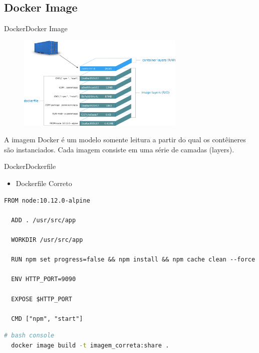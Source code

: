 \subsection{Docker Image}
\begin{frame}{Docker}{Docker Image}
  \begin{figure}[ht!]
    \centering
    \includegraphics[width=80mm]{images/image_layers.png}
  \end{figure}
  A imagem Docker é um modelo somente leitura a partir do qual os contêineres são instanciados. Cada imagem consiste em uma série de camadas (layers).
\end{frame}

\begin{frame}[fragile]{Docker}{Dockerfile}
  \begin{itemize}
    \item<1-> Dockerfile Correto
  \end{itemize}
  \begin{lstlisting}[language=docker]
  FROM node:10.12.0-alpine

  ADD . /usr/src/app

  WORKDIR /usr/src/app

  RUN npm set progress=false && npm install && npm cache clean --force

  ENV HTTP_PORT=9090

  EXPOSE $HTTP_PORT

  CMD ["npm", "start"]
  \end{lstlisting}
  \begin{lstlisting}[language=bash]
  # bash console
  docker image build -t imagem_correta:share .
  \end{lstlisting}
\end{frame}


